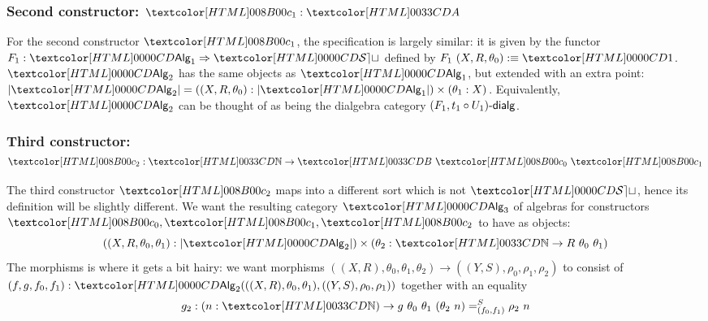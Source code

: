 \subsubsection{Second constructor: $\Aci : \Aty$}

For the second constructor $\Aci$, the specification is largely
similar: it is given by the functor $F_1 : \Func{\Alg_1}{\SET}$
defined by $F_1\ (X, R, \theta_0) \ddefeq \unitty$. $\Alg_2$ has the
same objects as $\Alg_1$, but extended with an extra point:
$| \Alg_2 | = ((X,R,\theta_0) : | \Alg_1 |) \times (\theta_1 : X)$.
Equivalently, $\Alg_2$ can be thought of as being the dialgebra
category $\dialgcat{F_1}{t_1 \circ U_1}$.

\subsubsection{Third constructor: $\Bcii : \natty \to \Bty\ \Aco\ \Aci$}

The third constructor $\Bcii$ maps into a different sort which is not
$\SET$, hence its definition will be slightly different. We want the
resulting category $\Alg_3$ of algebras for constructors
$\Aco, \Aci, \Bcii$ to have as objects:
$$
((X,R,\theta_0,\theta_1) : | \Alg_2 |) \times (\theta_2 : \natty \to R\ \theta_0\ \theta_1)
$$
The morphisms is where it gets a bit hairy: we want morphisms
$((X,R),\theta_0,\theta_1,\theta_2) \to ((Y,S),\rho_0,\rho_1,\rho_2)$
to consist of
$(f,g,f_0,f_1) :
\Alg_2(((X,R),\theta_0,\theta_1),((Y,S),\rho_0,\rho_1))$
together with an equality
$$
g_2 : (n : \natty)  \to \pathover{S}{(f_0,f_1)}{g\ \theta_0\ \theta_1\ (\theta_2\ n)}{\rho_2\ n}
$$

